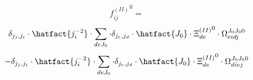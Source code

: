 
\begin{dmath*}
{f^{(II)}_{i j}}^{0} = 
\end{dmath*}
\begin{dmath*}
\delta_{{j}_{j},{j}_{i}} \cdot \hatfact{{j}_{i}^{-2}} \cdot \sum_{d e {J}_{0}} \cdot \delta_{{j}_{e},{j}_{d}} \cdot \hatfact{{J}_{0}} \cdot {\Xi^{(II)}_{d e}}^{0} \cdot \Omega_{e i d j}^{{J}_{0} {J}_{0} 0}
\end{dmath*}
\begin{dmath*}
-\delta_{{j}_{j},{j}_{i}} \cdot \hatfact{{j}_{i}^{-2}} \cdot \sum_{d e {J}_{0}} \cdot \delta_{{j}_{e},{j}_{d}} \cdot \hatfact{{J}_{0}} \cdot {\Xi^{(II)}_{d e}}^{0} \cdot \Omega_{d i e j}^{{J}_{0} {J}_{0} 0}
\end{dmath*}

